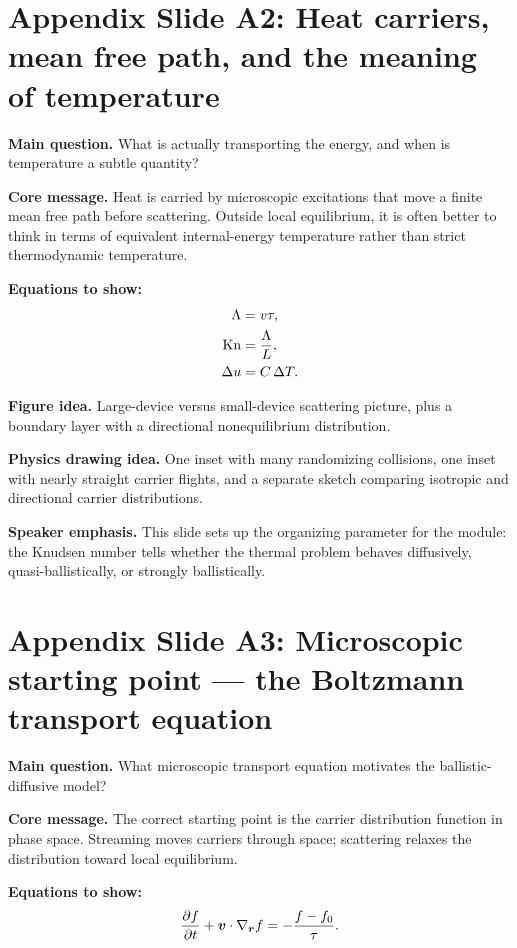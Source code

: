 \documentclass[11pt]{article}
\begin{document}
\section{Appendix Slide A2: Heat carriers, mean free path, and the meaning of temperature}
\begin{physicsbox}
\textbf{Main question.} What is actually transporting the energy, and when is temperature a subtle quantity?
\end{physicsbox}

\textbf{Core message.} Heat is carried by microscopic excitations that move a finite mean free path before scattering. Outside local equilibrium, it is often better to think in terms of equivalent internal-energy temperature rather than strict thermodynamic temperature.

\textbf{Equations to show:}
\begin{align*}
\Lambda &= v\tau,\\
\mathrm{Kn} &= \frac{\Lambda}{L},\\
\Delta u &= C\,\Delta T.
\end{align*}

\textbf{Figure idea.} Large-device versus small-device scattering picture, plus a boundary layer with a directional nonequilibrium distribution.

\textbf{Physics drawing idea.} One inset with many randomizing collisions, one inset with nearly straight carrier flights, and a separate sketch comparing isotropic and directional carrier distributions.

\textbf{Speaker emphasis.} This slide sets up the organizing parameter for the module: the Knudsen number tells whether the thermal problem behaves diffusively, quasi-ballistically, or strongly ballistically.

\section{Appendix Slide A3: Microscopic starting point --- the Boltzmann transport equation}
\begin{physicsbox}
\textbf{Main question.} What microscopic transport equation motivates the ballistic-diffusive model?
\end{physicsbox}

\textbf{Core message.} The correct starting point is the carrier distribution function in phase space. Streaming moves carriers through space; scattering relaxes the distribution toward local equilibrium.

\textbf{Equations to show:}
\begin{equation*}
\frac{\partial f}{\partial t}+\bm{v}\cdot\nabla_{\bm{r}} f=-\frac{f-f_0}{\tau}.
\end{equation*}
\end{document}
